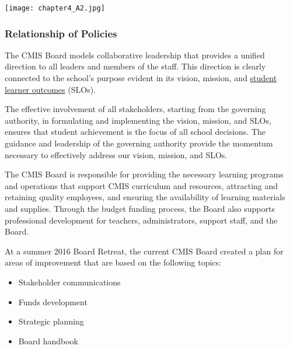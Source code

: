{\centering\texttt{[image: chapter4\_A2.jpg]}}

\subsubsection{Relationship of Policies}



\begin{findings}
The CMIS Board models collaborative leadership that provides a unified direction to all leaders and members of the staff. This direction is clearly connected to the school’s purpose evident in its vision, mission, and \href{https://docs.google.com/document/d/1bIbV9pgGz2vpXYJdnRzL_Od5PS35egy7lgBOBuszgD4/edit}{student learner outcomes} (SLOs).

The effective involvement of all stakeholders, starting from the governing authority, in formulating and implementing the vision, mission, and SLOs, ensures that student achievement is the focus of all school decisions. The guidance and leadership of the governing authority provide the momentum necessary to effectively address our vision, mission, and SLOs.

The CMIS Board is responsible for providing the necessary learning programs and operations that support CMIS curriculum and resources, attracting and retaining quality employees, and ensuring the availability of learning materials and supplies. Through the budget funding process, the Board also supports professional development for teachers, administrators, support staff, and the Board.

At a summer 2016 Board Retreat, the current CMIS Board created a plan for areas of improvement that are based on the following topics: 

\begin{itemize}
\item Stakeholder communications
\item Funds development
\item Strategic planning
\item Board handbook
\end{itemize}


\end{findings}
